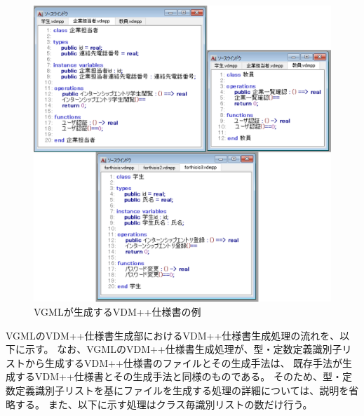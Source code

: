 \begin{figure}[t]
    \begin{center}
        \includegraphics[width=1.0\columnwidth]{image/4_vdm.png}
        \caption{VGMLが生成するVDM++仕様書の例}
        \label{fig:4_vdm}
    \end{center}
\end{figure}

VGMLのVDM++仕様書生成部におけるVDM++仕様書生成処理の流れを、以下に示す。
なお、VGMLのVDM++仕様書生成処理が、型・定数定義識別子リストから生成するVDM++仕様書のファイルとその生成手法は、
既存手法が生成するVDM++仕様書とその生成手法と同様のものである。
そのため、型・定数定義識別子リストを基にファイルを生成する処理の詳細については、説明を省略する。
また、以下に示す処理はクラス毎識別リストの数だけ行う。

